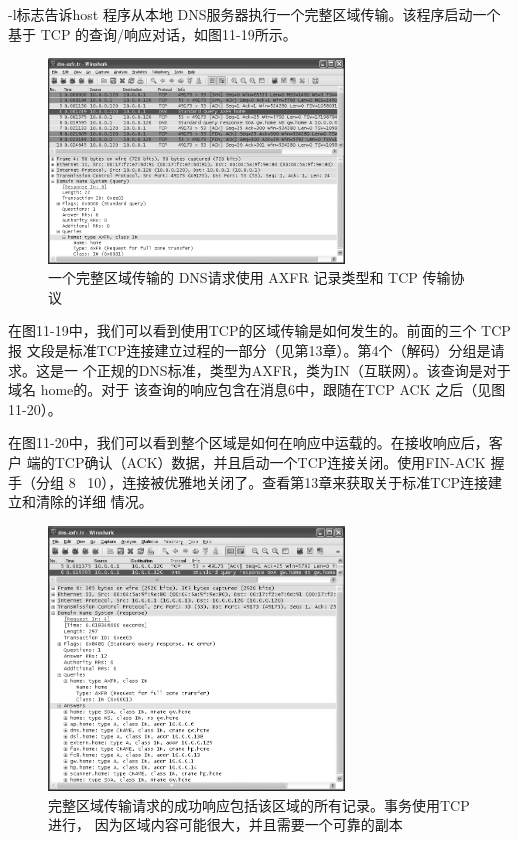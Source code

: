 -l标志告诉host 程序从本地 DNS服务器执行一个完整区域传输。该程序启动一个基于 TCP
的查询/响应对话，如图11-19所示。


\begin{figure}[!htb]
    \centering
	\includegraphics[width=0.7\textwidth]{imgs/11/11-19.png}
	\caption{一个完整区域传输的 DNS请求使用 AXFR 记录类型和 TCP 传输协议}
\end{figure}

在图11-19中，我们可以看到使用TCP的区域传输是如何发生的。前面的三个 TCP报
文段是标准TCP连接建立过程的一部分（见第13章）。第4个（解码）分组是请求。这是一
个正规的DNS标准，类型为AXFR，类为IN（互联网）。该查询是对于域名 home的。对于
该查询的响应包含在消息6中，跟随在TCP ACK 之后（见图11-20）。

在图11-20中，我们可以看到整个区域是如何在响应中运载的。在接收响应后，客户
端的TCP确认（ACK）数据，并且启动一个TCP连接关闭。使用FIN-ACK 握手（分组
8 ~10），连接被优雅地关闭了。查看第13章来获取关于标准TCP连接建立和清除的详细
情况。

\begin{figure}[!htb]
    \centering
	\includegraphics[width=0.7\textwidth]{imgs/11/11-20.png}
	\caption{完整区域传输请求的成功响应包括该区域的所有记录。事务使用TCP 进行，
            因为区域内容可能很大，并且需要一个可靠的副本}
\end{figure}

